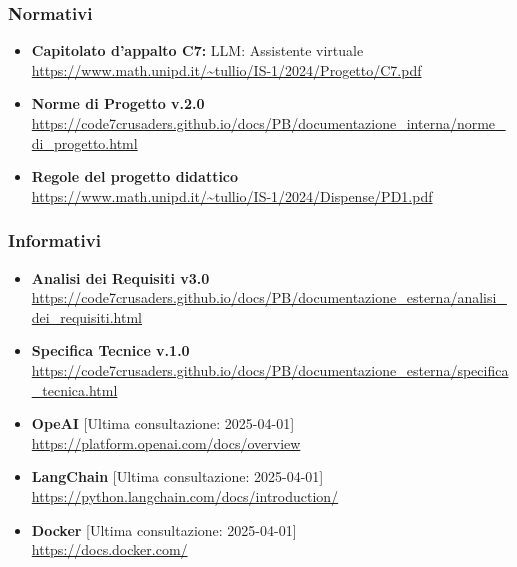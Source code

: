     \subsubsection{Normativi}
        \begin{itemize}
            \item \textbf{Capitolato d'appalto C7:} LLM: Assistente virtuale \\ \url{https://www.math.unipd.it/~tullio/IS-1/2024/Progetto/C7.pdf}
            \item \textbf{Norme di Progetto v.2.0} \\ \url{https://code7crusaders.github.io/docs/PB/documentazione_interna/norme_di_progetto.html}
            \item \textbf{Regole del progetto didattico} \\ \url{https://www.math.unipd.it/~tullio/IS-1/2024/Dispense/PD1.pdf}
        \end{itemize}
    \subsubsection{Informativi}
        \begin{itemize}
            \item \textbf{Analisi dei Requisiti v3.0} \\ \url{https://code7crusaders.github.io/docs/PB/documentazione_esterna/analisi_dei_requisiti.html}
            \item \textbf{Specifica Tecnice v.1.0} \\ \url{https://code7crusaders.github.io/docs/PB/documentazione_esterna/specifica_tecnica.html}
            \item \textbf{OpeAI} [Ultima consultazione: 2025-04-01] \\ \url{https://platform.openai.com/docs/overview} 
            \item \textbf{LangChain} [Ultima consultazione: 2025-04-01] \\ \url{https://python.langchain.com/docs/introduction/} 
            \item \textbf{Docker} [Ultima consultazione: 2025-04-01] \\ \url{https://docs.docker.com/} 
        \end{itemize}